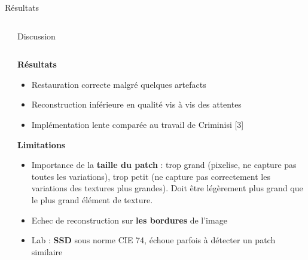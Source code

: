 \documentclass[final,hyperref={pdfpagelabels=false}]{beamer}
\begin{document}
\begin{frame}[t]
\begin{columns}[t]
\begin{column}{.465\textwidth}
\begin{block}{\Large Résultats}
\end{block}

\end{column}


\end{columns}

\begin{columns}[t]
\begin{column}{.02\textwidth} \end{column}
\begin{column}{.930\textwidth} 
\begin{block}{\Large Discussion}
\begin{columns}[t]
\begin{column}{.496\textwidth}

\textbf{Résultats}
\begin{itemize}
\item Restauration correcte malgré quelques artefacts
\item Reconstruction inférieure en qualité vis à vis des attentes
\item Implémentation lente comparée au travail de Criminisi [3]
\end{itemize}
\textbf{Limitations}
\begin{itemize}
\item Importance de la \textbf{taille du patch} : trop grand (pixelise, ne capture pas toutes les variations), trop petit (ne capture pas correctement les variations des textures plus grandes). Doit être légèrement plus grand que le plus grand élément de texture. 
\item Echec de reconstruction sur \textbf{les bordures} de l'image
\item Lab : \textbf{SSD} sous norme CIE 74, échoue parfois à détecter un patch similaire
\end{itemize}



\end{column}
\end{columns}
\end{block}
\end{column}
\end{columns}
\end{frame}
\end{document}
